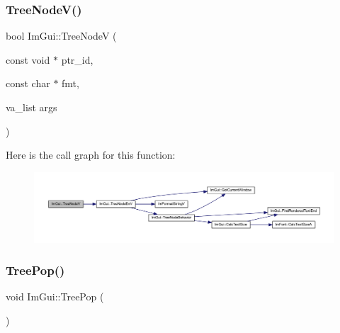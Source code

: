 \subsubsection{\texorpdfstring{Tree\+Node\+V()}{TreeNodeV()}\hspace{0.1cm}{\footnotesize\ttfamily [2/2]}}
{\footnotesize\ttfamily bool Im\+Gui\+::\+Tree\+NodeV (\begin{DoxyParamCaption}\item[{const void $\ast$}]{ptr\+\_\+id,  }\item[{const char $\ast$}]{fmt,  }\item[{va\+\_\+list}]{args }\end{DoxyParamCaption})}

Here is the call graph for this function\+:
\nopagebreak
\begin{figure}[H]
\begin{center}
\leavevmode
\includegraphics[width=350pt]{namespace_im_gui_a15320f61ba6b4916af3323bf7844602e_cgraph}
\end{center}
\end{figure}
\mbox{\label{namespace_im_gui_a41ecf265e5f678c78fc9c30b3cf2077f}} 
\subsubsection{\texorpdfstring{Tree\+Pop()}{TreePop()}}
{\footnotesize\ttfamily void Im\+Gui\+::\+Tree\+Pop (\begin{DoxyParamCaption}{ }\end{DoxyParamCaption})}


